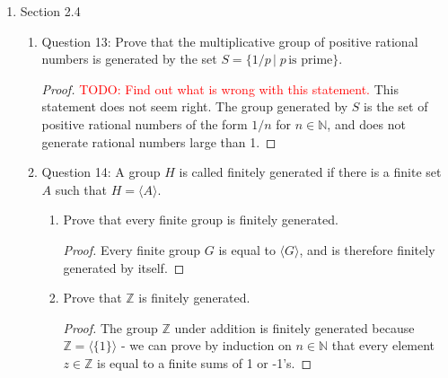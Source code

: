 \documentclass{article}
\newcommand{\TODO}[1]{\textcolor{red}{TODO: #1}}
\begin{document}
\begin{enumerate}
\begin{enumerate}
\begin{enumerate}
\begin{proof}
              The given map is a homomorphism since
              $\bar{a}\bar{b}=\overline{ab}$ is mapped to $\sigma_{ab}$ by
              definition, which is equal to $\sigma_a\circ\sigma_b$ as we
              have just shown, which is equal to the image of $\bar{a}$
              composed with the image of $\bar{b}$. The given map is also
              injective by question~\ref{qn:inj}. Finally, by
              questions~\ref{qn:rel-prime} and ~\ref{qn:auto}, the map is
              surjective. Hence the map is an isomorphism.
            \end{proof}
        \end{enumerate}
    \end{enumerate}

  \item Section 2.4
    \begin{enumerate}
      \item Question 13: Prove that the multiplicative group of positive
        rational numbers is generated by the set $S=\{1/p\,|\;p\,\text{is
        prime}\}$.
        \begin{proof}
          \TODO{Find out what is wrong with this statement.}
          This statement does not seem right. The group generated by $S$ is
          the set of positive rational numbers of the form $1/n$ for
          $n\in\mathbb{N}$, and does not generate rational numbers large
          than 1.
        \end{proof}

      \item Question 14: A group $H$ is called finitely generated if there
        is a finite set $A$ such that $H=\langle A\rangle$.

        \begin{enumerate}
          \item Prove that every finite group is finitely generated.
            \begin{proof}
              Every finite group $G$ is equal to $\langle
              G\rangle$, and is therefore finitely generated by itself.
            \end{proof}

          \item Prove that $\mathbb{Z}$ is finitely generated.
            \begin{proof}
              The group $\mathbb{Z}$ under addition is finitely generated
              because $\mathbb{Z}=\langle\{1\}\rangle$ - we can prove by
              induction on $n\in\mathbb{N}$ that every element
              $z\in\mathbb{Z}$ is equal to a finite sums of 1 or -1's.
            \end{proof}


\end{enumerate}
\end{enumerate}
\end{enumerate}
\end{document}
